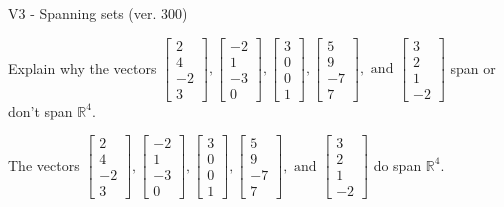 \begin{exercise}
  \begin{exerciseTitle}V3 - Spanning sets (ver. 300)\end{exerciseTitle}
  \begin{exerciseStatement}
    Explain why the vectors \(\left[\begin{array}{r}
2 \\
4 \\
-2 \\
3
\end{array}\right] , \left[\begin{array}{r}
-2 \\
1 \\
-3 \\
0
\end{array}\right] , \left[\begin{array}{r}
3 \\
0 \\
0 \\
1
\end{array}\right] , \left[\begin{array}{r}
5 \\
9 \\
-7 \\
7
\end{array}\right] , \text{ and } \left[\begin{array}{r}
3 \\
2 \\
1 \\
-2
\end{array}\right]\) span or don't span \(\mathbb{R}^4\). 
	


  \end{exerciseStatement}
  \begin{exerciseAnswer}
   The vectors \(\left[\begin{array}{r}
2 \\
4 \\
-2 \\
3
\end{array}\right] , \left[\begin{array}{r}
-2 \\
1 \\
-3 \\
0
\end{array}\right] , \left[\begin{array}{r}
3 \\
0 \\
0 \\
1
\end{array}\right] , \left[\begin{array}{r}
5 \\
9 \\
-7 \\
7
\end{array}\right] , \text{ and } \left[\begin{array}{r}
3 \\
2 \\
1 \\
-2
\end{array}\right]\) 
  	 do  
	span \(\mathbb{R}^4\).
  


  \end{exerciseAnswer}
\end{exercise}